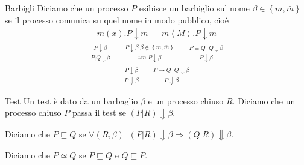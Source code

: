 \documentclass{beamer}
\theoremstyle{plain}
\theoremstyle{definition}
\theoremstyle{remark}
\newcommand{\set}[1]{\left\{#1\right\}}
\newcommand{\ang}[1]{\left<#1\right>}
\begin{document}
\begin{frame}{Barbigli}
  Diciamo che un processo $P$ esibisce un barbiglio sul nome
  $\beta \in \set{m,\bar m}$ se il processo comunica su quel nome in
  modo pubblico, cioè
  \begin{align*}
    m(x).P \downarrow m & & \bar m \ang{M}.P \downarrow \bar m 
  \end{align*}
  \begin{align*}
    \frac{P\downarrow \beta}{ P|Q \downarrow \beta} & &
                                                        \frac{P\downarrow
                                                        \beta\; \beta
                                                      \not\in \set{m,
                                                      \bar m}}{ \nu
                                                      m. P \downarrow
                                                      \beta} & & \frac{
                                                               P
                                                               \equiv
                                                               Q \;\; Q
                                                               \downarrow
                                                               \beta}
                                                               {
                                                               P\downarrow
                                                               \beta}
  \end{align*}
  \begin{align*}
    \frac{P\downarrow \beta}{P\Downarrow \beta} & & \frac{P\rightarrow
                                                    Q\;\; Q \Downarrow
                                                    \beta }{P
                                                    \Downarrow \beta}
  \end{align*}
\end{frame}

\begin{frame}{Test}
  Un test è dato da un barbaglio $\beta$ e un processo chiuso
  $R$. Diciamo che un processo chiuso $P$ passa il test se $(P|R)
  \Downarrow \beta$.
  \vfill

  Diciamo che $P \sqsubseteq Q$ se  $\forall (R,\beta)\;\; (P|R)\Downarrow \beta \Rightarrow
  (Q|R)\Downarrow \beta$.

  Diciamo che $P \simeq Q$ se $P \sqsubseteq Q$ e $Q \sqsubseteq P$.
\end{frame}
\end{document}
